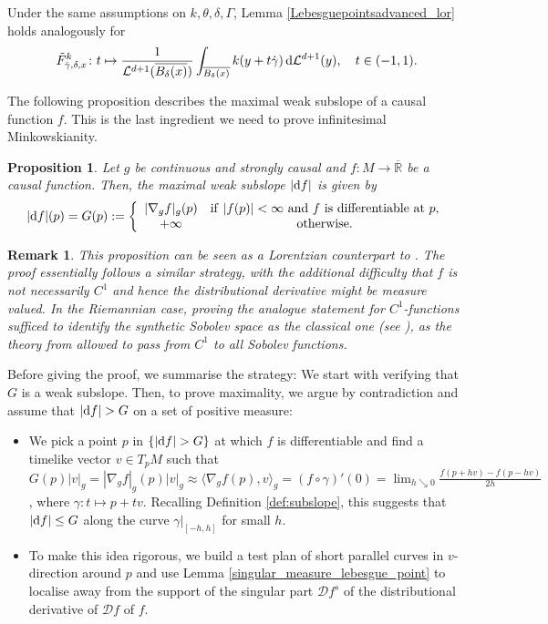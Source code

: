 \documentclass[a4paper,10pt]{article}
\newtheorem{proposition}[theorem]{Proposition}
\newtheorem{remark}[theorem]{Remark}
\numberwithin{equation}{section}
\newcommand{\R}{\mathbb{R}}
\newcommand{\di}{{\rm d}}
\begin{document}
Under the same assumptions on $k, \theta, \delta, \Gamma$, Lemma \ref{Lebesguepointsadvanced_lor} holds analogously for 
 \begin{align}\label{def_f_tilde_lebesgue_advanced}
        \Tilde{F}^k_{\dot{\gamma}, \delta, x}\colon  t \mapsto \frac{1}{\mathcal{L}^{d+1}(\overline{B_\delta(x)})}\int_{\overline{B_\delta(x)}} k(y + t\dot{\gamma})\,\di\mathcal{L}^{d+1}(y), \quad  t \in (-1, 1).
    \end{align}

The following proposition describes the maximal weak subslope of a causal function $f$. This is the last ingredient we need to prove infinitesimal Minkowskianity.
 \smallskip
 
\begin{proposition}\label{weak_subslope_identified}
    Let $g$ be continuous and strongly causal and $f\colon M \to \overline{\R}$ be a causal function. Then, the maximal weak subslope $|\di f|$ is given by 
    \begin{align}
        |\di f|(p) =G(p):= \left\{\begin{array}{cc}
          |\nabla_g f|_g(p)   & \mathrm{if}\  |f(p)| < \infty\ \mathrm{and\ } f \ \mathrm{is}\ \mathrm{differentiable\ at\ }p, \\
           +\infty  & \mathrm{otherwise}.
        \end{array} \right.
    \end{align}
\end{proposition}
\begin{remark}
This proposition can be seen as a Lorentzian counterpart to \cite[Proposition 4.24]{mondino2025equivalence}. The proof essentially follows a similar strategy, with the additional difficulty that $f$ is not necessarily $C^1$ and hence the distributional derivative might be measure valued. In the Riemannian case, proving the analogue statement for $C^1$-functions sufficed to identify the synthetic Sobolev space as the classical one (see \cite[Section 4.4]{mondino2025equivalence}), as the theory from \cite{ambrosio2014inventio, ambrosio2014duke} allowed to pass from $C^1$ to all Sobolev functions.  
\end{remark}
Before giving the proof, we summarise the strategy: We start with verifying that $G$ is a weak subslope. Then, to prove maximality, we argue by contradiction and assume that $|\di f|>G$ on a set of positive measure: 
\begin{itemize}
    \item We pick a point $p$ in $\{|\di f|>G\}$ at which $f$ is differentiable and find a timelike vector $v \in T_pM$ such that $G(p)|v|_g =|\nabla_g f|_g(p) |v|_g \approx \langle\nabla_gf(p), v\rangle_g = (f \circ \gamma)'(0) = \lim_{h \searrow 0} \frac{f(p+hv)-f(p-hv)}{2h}$, where $\gamma\colon t \mapsto p+tv$. Recalling Definition \ref{def:subslope}, this suggests that $|\di f| \leq G$ along the curve $\gamma|_{[-h, h]}$ for small $h$.
    \item To make this idea rigorous, we build a test plan of short parallel curves in $v$-direction around $p$ and use Lemma \ref{singular_measure_lebesgue_point} to localise away from the support of the singular part $\mathcal{D}f^s$ of the distributional derivative of $\mathcal{D}f$ of $f$.
\end{itemize}
\end{document}

